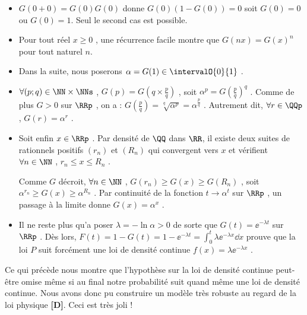 \begin{itemize}[label=\small\textbullet]
	\item $G(0 + 0) = G(0) G(0)$ donne $G(0)(1 - G(0)) = 0$ soit $G(0) = 0$ ou $G(0) = 1$. Seul le second cas est possible.

	


	\medskip
	\item Pour tout réel $x \geq 0$ , une récurrence facile montre que $G(nx) = G(x)^n$ pour tout naturel $n$.

	


	\medskip
	\item Dans la suite, nous poserons $\alpha = G(1) \in \intervalO{0}{1}$ .

	


	\medskip
	\item $\forall (p ; q) \in \NN \times \NNs$ , $G(p) = G \left( q \times \frac{p}{q} \right)$ , soit $\alpha ^p = G \left( \frac{p}{q} \right)^q$ .
	Comme de plus $G > 0$ sur $\RRp$ , on a : $G \left( \frac{p}{q} \right) = \sqrt[q\,\,]{\alpha^p} = \alpha^{\frac{p}{q}}$ .
	Autrement dit, $\forall r \in \QQp$ , $G(r) = \alpha^r$ .

	


	\medskip
	\item Soit enfin $x \in \RRp$ . Par densité de $\QQ$ dans $\RR$, il existe deux suites de rationnels positifs $(r_n)$ et $(R_n)$ qui convergent vers $x$ et vérifient $\forall n \in \NN$ , $r_n \leq x \leq R_n$ .
	
	\smallskip\noindent
	Comme $G$ décroit, $\forall n \in \NN$ , $G(r_n) \geq G(x) \geq G(R_n)$ , soit $\alpha^{r_n} \geq G(x) \geq \alpha^{R_n}$ .
	Par continuité de la fonction $t \rightarrow \alpha^t$ sur $\RRp$ , un passage à la limite donne $G(x) = \alpha^x$ .

	


	\medskip
	\item Il ne reste plus qu'a poser $\lambda = - \ln \alpha > 0$ de sorte que $G(t) = \ee^{- \lambda t}$ sur $\RRp$ .
	Dès lors, $\displaystyle F(t) = 1 - G(t) = 1 - \ee^{- \lambda t} = \int_0^t \lambda \ee^{-\lambda x} \dd{x}$ prouve que la loi $P$ suit forcément une loi de densité continue $f(x) = \lambda \ee^{-\lambda x}$ .
\end{itemize}

	


\medskip


Ce qui précède nous montre que l'hypothèse sur la loi de densité continue peut-être omise même si au final notre probabilité suit quand même une loi de densité continue. Nous avons donc pu construire un modèle très robuste au regard de la loi physique \textbf{[D]}. Ceci est très joli !
